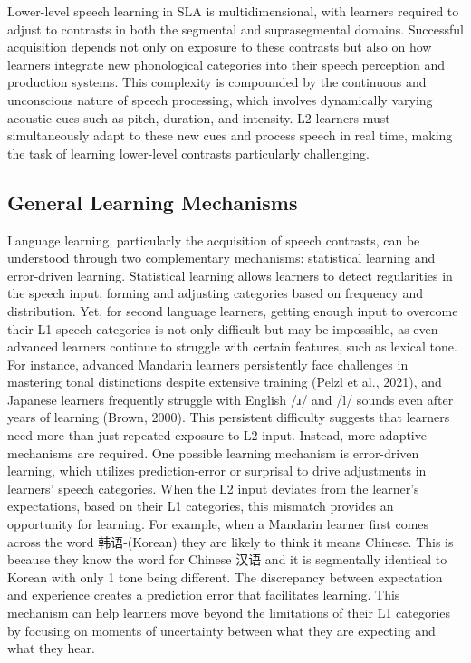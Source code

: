 Lower-level speech learning in SLA is multidimensional, with learners required to adjust to contrasts in both the segmental and suprasegmental domains. Successful acquisition depends not only on exposure to these contrasts but also on how learners integrate new phonological categories into their speech perception and production systems. This complexity is compounded by the continuous and unconscious nature of speech processing, which involves dynamically varying acoustic cues such as pitch, duration, and intensity. L2 learners must simultaneously adapt to these new cues and process speech in real time, making the task of learning lower-level contrasts particularly challenging.



\subsection{General Learning Mechanisms}

Language learning, particularly the acquisition of speech contrasts, can be understood through two complementary mechanisms: statistical learning and error-driven learning. Statistical learning allows learners to detect regularities in the speech input, forming and adjusting categories based on frequency and distribution. Yet, for second language learners, getting enough input to overcome their L1 speech categories is not only difficult but may be impossible, as even advanced learners continue to struggle with certain features, such as lexical tone. For instance, advanced Mandarin learners persistently face challenges in mastering tonal distinctions despite extensive training (Pelzl et al., 2021), and Japanese learners frequently struggle with English /ɹ/ and /l/ sounds even after years of learning (Brown, 2000). This persistent difficulty suggests that learners need more than just repeated exposure to L2 input. Instead, more adaptive mechanisms are required. One possible learning mechanism is error-driven learning, which utilizes prediction-error or surprisal to drive adjustments in learners' speech categories. When the L2 input deviates from the learner's expectations, based on their L1 categories, this mismatch provides an opportunity for learning. For example, when a Mandarin learner first comes across the word 韩语-(Korean) they are likely to think it means Chinese. This is because they know the word for Chinese 汉语 and it is segmentally identical to Korean with only 1 tone being different. The discrepancy between expectation and experience creates a prediction error that facilitates learning. This mechanism can help learners move beyond the limitations of their L1 categories by focusing on moments of uncertainty between what they are expecting and what they hear.

